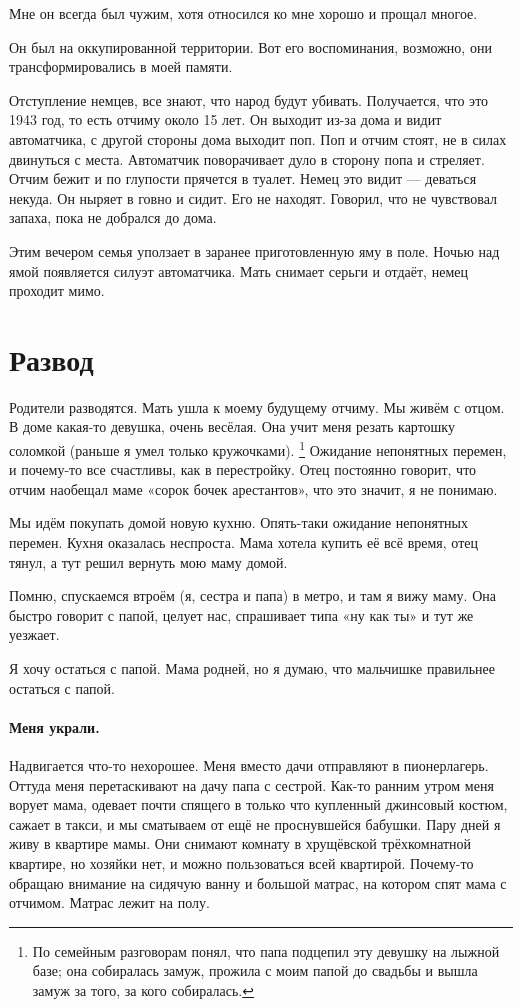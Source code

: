 \documentclass{book}
\begin{document}
Мне он всегда был чужим, хотя относился ко мне хорошо и прощал многое.

Он был на оккупированной территории.
Вот его воспоминания, возможно, они трансформировались в моей памяти.

Отступление немцев, все знают, что народ будут убивать.
Получается, что это 1943 год, то есть отчиму около 15 лет.
Он выходит из-за дома и видит автоматчика, с другой стороны дома выходит поп.
Поп и отчим стоят, не в силах двинуться с места.
Автоматчик поворачивает дуло в сторону попа и стреляет.
Отчим бежит и по глупости прячется в туалет.
Немец это видит --- деваться некуда.
Он ныряет в говно и сидит. 
Его не находят.
Говорил, что не чувствовал запаха, пока не добрался до дома.

Этим вечером семья уползает в заранее приготовленную яму в поле.
Ночью над ямой появляется силуэт автоматчика.
Мать снимает серьги и отдаёт, немец проходит мимо.


\section*{Развод}

Родители разводятся.
Мать ушла к моему будущему отчиму.
Мы живём с отцом.
В доме какая-то девушка, очень весёлая.
Она учит меня резать картошку соломкой (раньше я умел только кружочками).%
\footnote{По семейным разговорам понял, что папа подцепил эту девушку на лыжной базе;
она собиралась замуж, прожила с моим папой до свадьбы и вышла замуж за того, за кого собиралась.}
Ожидание непонятных перемен, и почему-то все счастливы, как в перестройку.
Отец постоянно говорит, что отчим наобещал маме «сорок бочек арестантов», что это значит, я не понимаю.

Мы идём покупать домой новую кухню.
Опять-таки ожидание непонятных перемен.
Кухня оказалась неспроста.
Мама хотела купить её всё время, отец тянул, а тут решил вернуть мою маму домой.

Помню, спускаемся втроём (я, сестра и папа) в метро, и там я вижу маму.
Она быстро говорит с папой, целует нас, спрашивает типа «ну как ты» и тут же уезжает.

Я хочу остаться с папой.
Мама родней, но я думаю, что мальчишке правильнее остаться с папой.

\paragraph{Меня украли.}
Надвигается что-то нехорошее.
Меня вместо дачи отправляют в пионерлагерь.
Оттуда меня перетаскивают на дачу папа с сестрой.
Как-то ранним утром меня ворует мама, одевает почти спящего в только что купленный джинсовый костюм, сажает в такси, и мы сматываем от ещё не проснувшейся бабушки.
Пару дней я живу в квартире мамы.
Они снимают комнату в хрущёвской трёхкомнатной квартире, но хозяйки нет, и можно пользоваться всей квартирой.
Почему-то обращаю внимание на сидячую ванну и большой матрас, на котором спят мама с отчимом.
Матрас лежит на полу.
\end{document}
